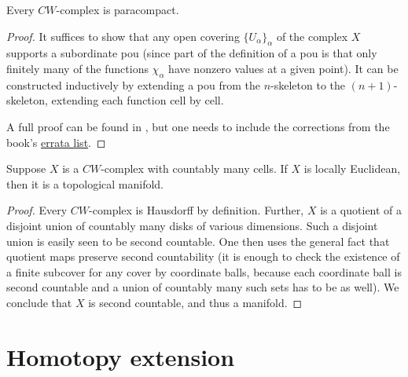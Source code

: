 \begin{thm}
    Every $CW$-complex is paracompact.
\end{thm}
\begin{proof}
    It suffices to show that any open covering $\{U_\alpha\}_\alpha$ of the complex $X$ supports a subordinate \gls{pou} (since part of the definition of a \gls{pou} is that only finitely many of the functions $\chi_\alpha$ have nonzero values at a given point). It can be constructed inductively by extending a \gls{pou} from the $n$-skeleton to the $(n+1)$-skeleton, extending each function cell by cell.
    
    A full proof can be found in \cite[Thm.~5.22]{LeeTop}, but one needs to include the corrections from the book's \href{https://sites.math.washington.edu//~lee/Books/ITM/errata.pdf}{errata list}. 
\end{proof}

\begin{prop}
    Suppose $X$ is a $CW$-complex with countably many cells. If $X$ is locally Euclidean, then it is a topological manifold.
\end{prop}
\begin{proof}
    Every $CW$-complex is Hausdorff by definition. Further, $X$ is a quotient of a disjoint union of countably many disks of various dimensions. Such a disjoint union is easily seen to be second countable. One then uses the general fact that quotient maps preserve second countability (it is enough to check the existence of a finite subcover for any cover by coordinate balls, because each coordinate ball is second countable and a union of countably many such sets has to be as well). We conclude that $X$ is second countable, and thus a manifold.
\end{proof}




\section{Homotopy extension}

